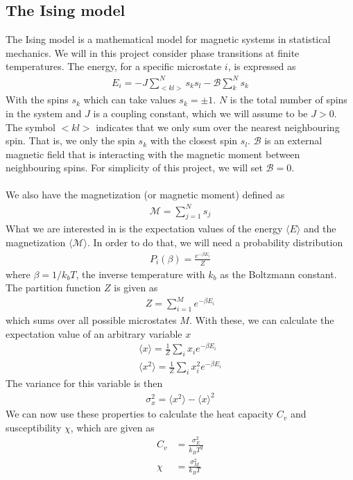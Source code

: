 \documentclass[12pt]{article}
\begin{document}
\subsection{The Ising model}
The Ising model is a mathematical model for magnetic systems in statistical mechanics. We will in this project consider phase transitions at finite temperatures. The energy, for a specific microstate $i$, is expressed as
\begin{align*}
E_i = -J \displaystyle \sum^N_{< kl >}s_ks_l - \mathcal{B}\sum^N_k s_k
\end{align*}
With the spins $s_k$ which can take values $s_k = \pm 1$. $N$ is the total number of spins in the system and $J$ is a coupling constant, which we will assume to be $J>0$. The symbol $< kl >$ indicates that we only sum over the nearest neighbouring spin. That is, we only the spin $s_k$ with the closest spin $s_l$. $\mathcal{B}$ is an external magnetic field that is interacting with the magnetic moment between neighbouring spins. For simplicity of this project, we will set $\mathcal{B} = 0$.\\\\
We also have the magnetization (or magnetic moment) defined as
\begin{align*}
\mathcal{M} = \displaystyle \sum^N_{j=1} s_j
\end{align*}
What we are interested in is the expectation values of the energy $\langle E \rangle$ and the magnetization $\langle \mathcal{M} \rangle$. In order to do that, we will need a probability distribution
\begin{align*}
P_i(\beta) = \frac{e^{-\beta E_i}}{Z}
\end{align*}
where $\beta = 1/k_bT$, the inverse temperature with $k_b$ as the Boltzmann constant. The partition function $Z$ is given as
\begin{align}
Z = \displaystyle \sum_{i=1}^M e^{-\beta E_i}
\label{eq:Partition_func}
\end{align}
which sums over all possible microstates $M$. With these, we can calculate the expectation value of an arbitrary variable $x$
\begin{align*}
\langle x \rangle = \frac{1}{Z}\sum_i x_i e^{-\beta E_i} \\
\langle x^2 \rangle = \frac{1}{Z}\sum_i x_i^2 e^{-\beta E_i}
\end{align*} 
The variance for this variable is then
\begin{align*}
\sigma_x^2 = \langle x^2 \rangle - \langle x \rangle^2
\end{align*}
We can now use these properties to calculate the heat capacity $C_v$ and susceptibility $\chi$, which are given as
\begin{align*}
C_v &= \frac{\sigma_E^2}{k_BT^2} \\
\chi &= \frac{\sigma_M^2}{k_BT}
\end{align*}
\end{document}
